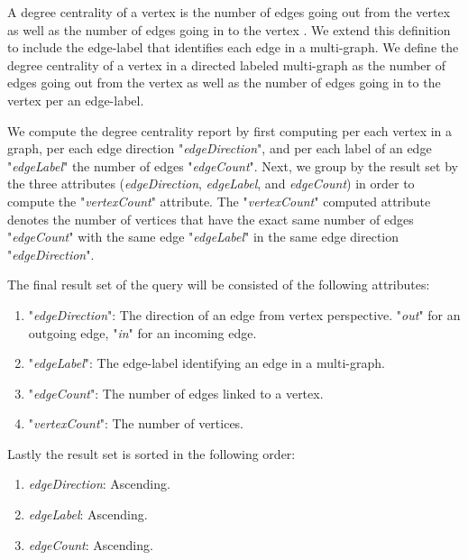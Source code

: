 {A degree centrality of a vertex is the number of edges going out from the vertex as well as the number of edges going in to the vertex \cite{newman2008mathematics}. We extend this definition to include the edge-label that identifies each edge in a multi-graph. We  define the degree centrality of a vertex in a directed labeled multi-graph as the number of edges going out from the vertex as well as the number of edges going in to the vertex per an edge-label. 

We compute the degree centrality report by first computing per each vertex in a graph, per each edge direction "\textit{edgeDirection}", and per each label of an edge "\textit{edgeLabel}" the number of edges "\textit{edgeCount}". Next, we group by the result set by the three attributes (\textit{edgeDirection}, \textit{edgeLabel}, and \textit{edgeCount}) in order to compute the "\textit{vertexCount}" attribute. The "\textit{vertexCount}" computed attribute denotes the number of vertices that have the exact same number of edges "\textit{edgeCount}" with the same edge "\textit{edgeLabel}" in the same edge direction "\textit{edgeDirection}".

The final result set of the query will be consisted of the following attributes:

\begin{enumerate}

\item "\textit{edgeDirection}": The direction of an edge from vertex perspective. "\textit{out}" for an outgoing edge, "\textit{in}" for an incoming edge.
\item "\textit{edgeLabel}": The edge-label identifying an edge in a multi-graph.
\item "\textit{edgeCount}": The number of edges linked to a vertex.
\item "\textit{vertexCount}": The number of vertices.

\end{enumerate}

Lastly the result set is sorted in the following order:

\begin{enumerate}

\item \textit{edgeDirection}: Ascending.
\item \textit{edgeLabel}: Ascending.
\item \textit{edgeCount}: Ascending.

\end{enumerate}

}
